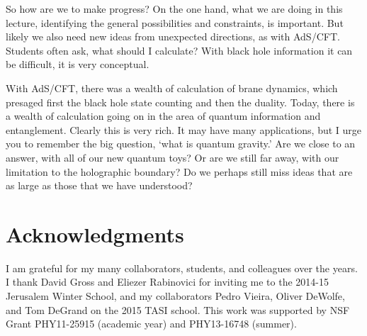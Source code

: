 \documentclass[12pt]{article}
\begin{document}
So how are we to make progress? On the one hand, what we are doing in this lecture, identifying the general possibilities and constraints, is important.  But likely we also need new ideas from unexpected directions, as with AdS/CFT.  Students often ask, what should I calculate?  With black hole information it can be difficult, it is very conceptual.  

With AdS/CFT, there was a wealth of calculation of brane dynamics, which presaged first the black hole state counting and then the duality.
Today, there is a wealth of calculation going on in the area of quantum information and entanglement.  
Clearly this is very rich.  It may have many applications, but I urge you to remember the big question, `what is quantum gravity.'  Are we close to an answer, with all of our new quantum toys?  Or are we still far away, with our limitation to the holographic boundary?  Do we perhaps still miss ideas that are as large as those that we have understood?





\section*{Acknowledgments}

I am grateful for my many collaborators, students, and colleagues over the years.  I thank David Gross and
Eliezer Rabinovici for inviting me to the 2014-15 Jerusalem Winter School, and my collaborators
  Pedro Vieira, Oliver DeWolfe, and Tom DeGrand on the 2015  TASI school.  This work was supported by NSF Grant PHY11-25915 (academic year) and PHY13-16748 (summer). 
\end{document}
